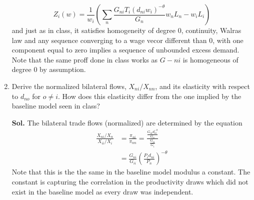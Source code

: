 \documentclass[12pt,oneside,reqno]{amsart}
\begin{document}
\begin{enumerate}
    \begin{equation*}
        Z_i(w) = \frac{1}{w_i} \left( \sum_n \frac{G_{ni} T_i (d_{ni} w_i)^{-\theta}}{G_n} w_n L_n  - w_i L_i  \right) 
    \end{equation*}
    and just as in class, it satisfies homogeneity of degree 0, continuity, Walras law and any sequence converging to a wage vecor different than 0, with one component equal to zero implies a sequence of unbounded excess demand. Note that the same proff done in class works as $G-{ni}$ is homogeneous of degree 0 by assumption. 
    \item Derive the normalized bilateral flows, $X_{n i} / X_{n n}$, and its elasticity with respect to $d_{n o}$ for $o \neq i$. How does this elasticity differ from the one implied by the baseline model seen in class?
    \item[\textbf{Sol.}] The bilateral trade flows (normalized) are determined by the equation 
    \begin{align*}
        \frac{X_{ni}/X_n}{X_{ii}/X_i} &= \frac{\pi_{ni}}{\pi_{nn}} 
        = \frac{\frac{G_{ni}d_{ni}^{-\theta}}{G_n}}{\frac{G_{ii}}{G_i}} \\
        &= \frac{G_{ni}}{G_{ii}} \left(\frac{P_id_{ni}}{P_n}\right)^{-\theta}
    \end{align*}
Note that this is the the same in the baseline model modulus a constant. The constant is capturing the correlation in the productivity draws which did not exist in the baseline model as every draw was independent. 
\end{enumerate}
\clearpage
\end{document}
